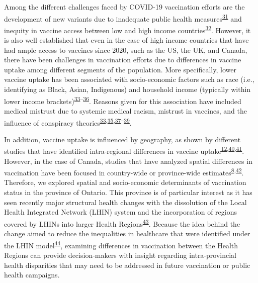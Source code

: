 \documentclass[
  letterpaper,
  DIV=11,
  numbers=noendperiod]{scrartcl}
\begin{document}
Among the different challenges faced by COVID-19 vaccination efforts are
the development of new variants due to inadequate public health
measures\textsuperscript{\protect\hyperlink{ref-li2021}{31}} and
inequity in vaccine access between low and high income
countries\textsuperscript{\protect\hyperlink{ref-tamey2022}{32}}.
However, it is also well established that even in the case of high
income countries that have had ample access to vaccines since 2020, such
as the US, the UK, and Canada, there have been challenges in vaccination
efforts due to differences in vaccine uptake among different segments of
the population. More specifically, lower vaccine uptake has been
associated with socio-economic factors such as race (i.e., identifying
as Black, Asian, Indigenous) and household income (typically within
lower income
brackets)\textsuperscript{\protect\hyperlink{ref-willis2021}{33}--\protect\hyperlink{ref-khubchandani2021}{36}}.
Reasons given for this association have included medical mistrust due to
systemic medical racism, mistrust in vaccines, and the influence of
conspiracy
theories\textsuperscript{\protect\hyperlink{ref-willis2021}{33},\protect\hyperlink{ref-stoler2021}{35},\protect\hyperlink{ref-bogart2021}{37}--\protect\hyperlink{ref-freeman2020}{39}}.

In addition, vaccine uptake is influenced by geography, as shown by
different studies that have identified intra-regional differences in
vaccine
uptake\textsuperscript{\protect\hyperlink{ref-mollalo2021}{12},\protect\hyperlink{ref-pallathadka2022}{40},\protect\hyperlink{ref-huang2022}{41}}.
However, in the case of Canada, studies that have analyzed spatial
differences in vaccination have been focused in country-wide or
province-wide
estimates\textsuperscript{\protect\hyperlink{ref-guay2022}{8},\protect\hyperlink{ref-lavoie2022}{42}}.
Therefore, we explored spatial and socio-economic determinants of
vaccination status in the province of Ontario. This province is of
particular interest as it has seen recently major structural health
changes with the dissolution of the Local Health Integrated Network
(LHIN) system and the incorporation of regions covered by LHINs into
larger Health
Regions\textsuperscript{\protect\hyperlink{ref-dong2022}{43}}. Because
the idea behind the change aimed to reduce the inequalities in
healthcare that were identified under the LHIN
model\textsuperscript{\protect\hyperlink{ref-tsasis2012}{44}}, examining
differences in vaccination between the Health Regions can provide
decision-makers with insight regarding intra-provincial health
disparities that may need to be addressed in future vaccination or
public health campaigns.
\end{document}
